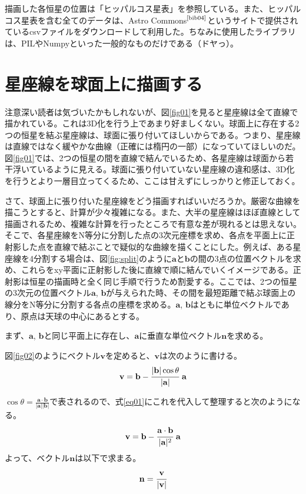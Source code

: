 \documentclass[../main]{subfiles}
\begin{document}
描画した各恒星の位置は「ヒッパルコス星表」を参照している。また、ヒッパルコス星表を含む全てのデータは、Astro Commons$^\text{\cite{bib04}}$というサイトで提供されているcsvファイルをダウンロードして利用した。ちなみに使用したライブラリは、PILやNumpyといった一般的なものだけである（ドヤっ）。


\section{星座線を球面上に描画する}
注意深い読者は気づいたかもしれないが、図\ref{fig01}を見ると星座線は全て直線で描かれている。これは3D化を行う上であまり好ましくない。球面上に存在する2つの恒星を結ぶ星座線は、球面に張り付いてほしいからである。つまり、星座線は直線ではなく緩やかな曲線（正確には楕円の一部）になっていてほしいのだ。図\ref{fig01}では、2つの恒星の間を直線で結んでいるため、各星座線は球面から若干浮いているように見える。球面に張り付いていない星座線の違和感は、3D化を行うとより一層目立ってくるため、ここは甘えずにしっかりと修正しておく。

さて、球面上に張り付いた星座線をどう描画すればいいだろうか。厳密な曲線を描こうとすると、計算が少々複雑になる。また、大半の星座線はほぼ直線として描画されるため、複雑な計算を行ったところで有意な差が現れるとは思えない。そこで、各星座線をN等分に分割した点の3次元座標を求め、各点を平面上に正射影した点を直線で結ぶことで疑似的な曲線を描くことにした。例えば、ある星座線を4分割する場合は、図\ref{fig:split}のように$\mathbf{a}$と$\mathbf{b}$の間の3点の位置ベクトルを求め、これらをxy平面に正射影した後に直線で順に結んでいくイメージである。正射影は恒星の描画時と全く同じ手順で行うため割愛する。ここでは、2つの恒星の3次元の位置ベクトル$\mathbf{a}$, $\mathbf{b}$が与えられた時、その間を最短距離で結ぶ球面上の線分をN等分に分割する各点の座標を求める。$\mathbf{a}$, $\mathbf{b}$はともに単位ベクトルであり、原点は天球の中心にあるとする。

まず、$\mathbf{a}$, $\mathbf{b}$と同じ平面上に存在し、$\mathbf{a}$に垂直な単位ベクトル$\mathbf{n}$を求める。

図\ref{fig02}のようにベクトル$\mathbf{v}$を定めると、$\mathbf{v}$は次のように書ける。
\begin{eqnarray}
  \mathbf{v} = \mathbf{b} - \cfrac{|\mathbf{b}|\cos{\theta}}{|\mathbf{a}|}\ \mathbf{a}  \label{eq01}
\end{eqnarray}

$\cos{\theta} = \frac{ \mathbf{a} \cdot \mathbf{b} }{ |\mathbf{a}| |\mathbf{b} |}$で表されるので、式\ref{eq01}にこれを代入して整理すると次のようになる。
\[
  \mathbf{v} = \mathbf{b} - \cfrac{\mathbf{a} \cdot \mathbf{b}}{|\mathbf{a}|^2}\  \mathbf{a}
\]
よって、ベクトル$\mathbf{n}$は以下で求まる。
\[
  \mathbf{n} = \cfrac{\mathbf{v}}{|\mathbf{v}|}
\]
\end{document}
